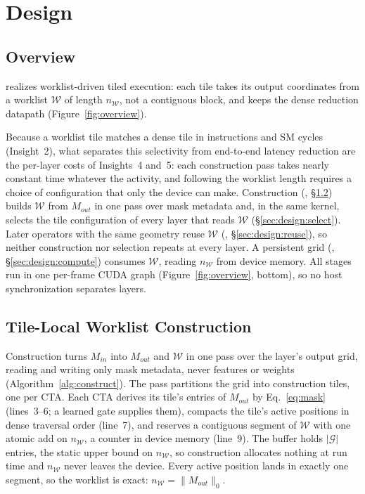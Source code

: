 \section{\sysname Design}
\label{sec:design}

\subsection{Overview}
\label{sec:overview}
\sysname realizes worklist-driven tiled execution: each tile takes its output coordinates from a worklist $\mathcal{W}$ of length $n_{\mathcal{W}}$, not a contiguous block, and keeps the dense reduction datapath (Figure~\ref{fig:overview}).

Because a worklist tile matches a dense tile in instructions and SM cycles
(Insight~2), what separates this selectivity from end-to-end latency reduction
are the per-layer costs of Insights~4 and~5: each construction pass takes
nearly constant time whatever the activity, and following the worklist length
requires a choice of configuration that only the device can make.
Construction (, \S\ref{sec:design:construct}) builds $\mathcal{W}$
from $M_{out}$ in one pass over mask metadata and, in the same kernel, selects
the tile configuration of every layer that reads $\mathcal{W}$
(\S\ref{sec:design:select}). Later operators with the same geometry reuse
$\mathcal{W}$ (, \S\ref{sec:design:reuse}), so neither construction
nor selection repeats at every layer. A persistent grid (,
\S\ref{sec:design:compute}) consumes $\mathcal{W}$, reading $n_{\mathcal{W}}$
from device memory. All stages run in one per-frame CUDA graph (Figure~\ref{fig:overview}, bottom), so no host synchronization separates layers.

\subsection{Tile-Local Worklist Construction}
\label{sec:design:construct}
\label{sec:design:construct:compact}

Construction turns $M_{in}$ into $M_{out}$ and $\mathcal{W}$ in
one pass over the layer's output grid, reading and writing only mask metadata,
never features or weights (Algorithm~\ref{alg:construct}). The pass partitions
the grid into construction tiles, one per CTA. Each CTA derives its tile's
entries of $M_{out}$ by Eq.~\ref{eq:mask} (lines~3--6; a learned gate supplies them), compacts the tile's active positions in dense traversal order
(line~7), and reserves a contiguous segment of $\mathcal{W}$ with one atomic
add on $n_{\mathcal{W}}$, a counter in device memory (line~9). The buffer holds $|\mathcal{G}|$ entries, the static
upper bound on $n_{\mathcal{W}}$, so construction allocates nothing at run time
and $n_{\mathcal{W}}$ never leaves the device. Every active position lands in
exactly one segment, so the worklist is exact: $n_{\mathcal{W}}=\|M_{out}\|_0$.


